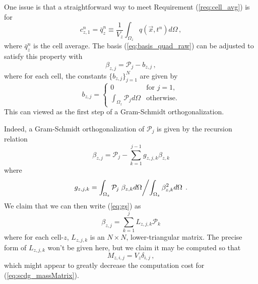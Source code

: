 \documentclass[11pt]{report}
\newcommand{\svec}[1]{{\Vec{#1}}}
\begin{document}
One issue is that a straightforward way to meet Requirement
(\ref{req:cell_avg}) is for
\begin{equation}
  c^{n}_{z,1} = \bar{q}^n_z \equiv \frac{1}{V_z} \int_{\Omega_z} q(\svec{x},t^n) d\Omega\,,
\end{equation}
where $\bar{q}^n_z$ is the cell average.  The basis (\ref{eq:basis_quad_raw})
can be adjusted to satisfy this property with
\begin{equation}
  \label{eq:basis_quad}
  \beta_{z,j} = \mathcal{P}_j - b_{z,j}\,,
\end{equation}
where for each cell, the constants $\{b_{z,j}\}_{j=1}^N$ are given by
\begin{equation}
  \label{eq:barray}
  b_{z,j} = 
  \begin{cases}
    0 & \text{for $j=1$},\\
    \int_{\Omega_z} \mathcal{P}_j d\Omega & \text{otherwise.}
  \end{cases}
\end{equation}
This can viewed as the first step of a Gram-Schmidt orthogonalization.

Indeed, a Gram-Schmidt orthogonalization of $\mathcal{P}_j$ is given by the
recursion relation
\begin{equation}
  \label{eq:gs}
  \beta_{z,j} = \mathcal{P}_j - \sum_{k=1}^{j-1} g_{z,j,k} \beta_{z,k} 
\end{equation}
where
\begin{equation}
  g_{z,j,k} = \int_{\Omega_z} \mathcal{P}_j \left. \beta_{z,k} d\Omega \middle/ 
                 \int_{\Omega_z} \beta_{z,k}^2 d\Omega \right. \,.
\end{equation}
We claim that we can then write (\ref{eq:gs}) as
\begin{equation}
  \label{eq:gs_mat}
  \beta_{z,j} = \sum_{k=1}^{j} L_{z,j,k} \mathcal{P}_k
\end{equation}
where for each cell-$z$, $L_{z,j,k}$ is an $N\times N$, lower-triangular
matrix.  The precise form of $L_{z,j,k}$ won't be given here, but we claim it
may be computed so that
\begin{equation}
  M_{z,i,j} = V_z \delta_{i,j}\,,
\end{equation}
which might appear to greatly decrease the computation cost for
(\ref{eq:scdg_massMatrix}).
\end{document}
